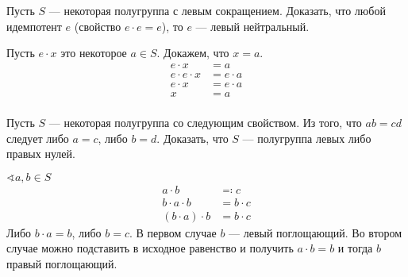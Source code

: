 \begin{exercise}
    Пусть \(S\) --- некоторая полугруппа с левым сокращением. Доказать, что любой идемпотент \(e\) (свойство \(e \cdot e = e\)), то \(e\) --- левый нейтральный.
\end{exercise}
\begin{solution}
    Пусть \(e \cdot x\) это некоторое \(a \in S\). Докажем, что \(x = a\).
    \begin{align*}
        e \cdot x         & = a         \\
        e \cdot e \cdot x & = e \cdot a \\
        e \cdot x         & = e \cdot a \\
        x                 & = a         \\
    \end{align*}
\end{solution}

\begin{exercise}
    Пусть \(S\) --- некоторая полугруппа со следующим свойством. Из того, что \(ab = cd\) следует либо \(a = c\), либо \(b = d\). Доказать, что \(S\) --- полугруппа левых либо правых нулей.
\end{exercise}
\begin{solution}
    \(\sphericalangle a, b \in S\)
    \begin{align*}
        a \cdot b           & \eqqcolon c \\
        b \cdot a \cdot b   & = b \cdot c \\
        (b \cdot a) \cdot b & = b \cdot c
    \end{align*}
    Либо \(b \cdot a = b\), либо \(b = c\). В первом случае \(b\) --- левый поглощающий. Во втором случае можно подставить в исходное равенство и получить \(a \cdot b = b\) и тогда \(b\) правый поглощающий.
\end{solution}

